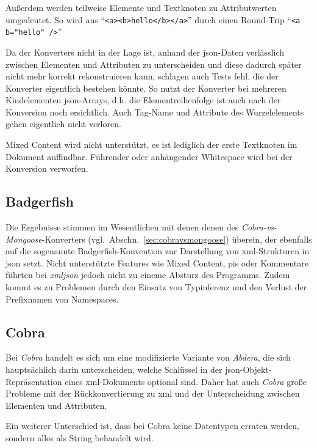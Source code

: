 Außerdem werden teilweise Elemente und Textknoten zu Attributwerten umgedeutet. So wird aus \enquote{\texttt{<a><b>hello</b></a>}} durch einen Round-Trip \enquote{\texttt{<a b="hello" />}}

Da der Konverters nicht in der Lage ist, anhand der \acrshort{json}-Daten verlässlich zwischen Elementen und Attributen zu unterscheiden und diese dadurch später nicht mehr korrekt rekonstruieren kann, schlagen auch Tests fehl, die der Konverter eigentlich bestehen könnte. So nutzt der Konverter bei mehreren Kindelementen \acrshort{json}-Arrays, d.h. die Elementreihenfolge ist auch nach der Konversion noch ersichtlich.
Auch Tag-Name und Attribute des Wurzelelements gehen eigentlich nicht verloren.

Mixed Content wird nicht unterstützt, es ist lediglich der erste Textknoten im Dokument auffindbar.
Führender oder anhängender Whitespace wird bei der Konversion verworfen.

\subsection{Badgerfish}
\label{sec:xmljson-badgerfish}

Die Ergebnisse stimmen im Wesentlichen mit denen  denen des \emph{Cobra-vs-Mongoose}-Konverters (vgl.~Abschn.~\ref{sec:cobravsmongoose}) überein, der ebenfalls auf die sogenannte Badgerfish-Konvention zur Darstellung von \acrshort{xml}-Strukturen in \acrshort{json} setzt. Nicht unterstützte Features wie Mixed Content, \glspl{pi} oder Kommentare führten bei \emph{xmljson} jedoch nicht zu eineme Absturz des Programms. Zudem kommt es zu Problemen durch den Einsatz von Typinferenz und den Verlust der Prefixnamen von Namespaces.

\subsection{Cobra}
\label{sec:xmljson-cobra}

Bei \emph{Cobra} handelt es sich um eine modifizierte Variante von \emph{Abdera}, die sich hauptsächlich darin unterscheiden, welche Schlüssel in der \acrshort{json}-Objekt-Repräsentation eines \acrshort{xml}-Dokuments optional sind. Daher hat auch \emph{Cobra} große Probleme mit der Rückkonvertierung zu \acrshort{xml} und der Unterscheidung zwischen Elementen und Attributen.

Ein weiterer Unterschied ist, dass bei Cobra keine Datentypen erraten werden, sondern alles als String behandelt wird.

